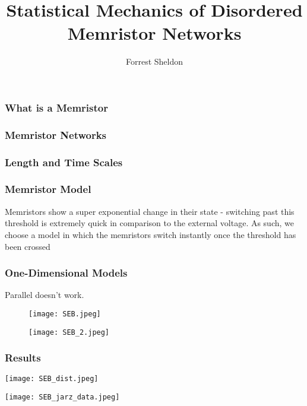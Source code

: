 \documentclass{beamer}
\title{Statistical Mechanics of Disordered Memristor Networks}
\author{Forrest Sheldon}
\begin{document}
\begin{frame}
\titlepage
\end{frame}

\begin{frame}
\frametitle{What is a Memristor}

\end{frame}


\begin{frame}
\frametitle{Memristor Networks}


\end{frame}

\begin{frame}
\frametitle{Length and Time Scales}


\end{frame}

\begin{frame}
\frametitle{Memristor Model}
Memristors show a super exponential change in their state - switching past
this threshold is extremely quick in comparison to the external voltage.  As such,
we choose a model in which the memristors switch instantly once the threshold has
been crossed
\end{frame}

\begin{frame}
\frametitle{One-Dimensional Models}
Parallel doesn't work.


\end{frame}

\begin{frame}

\begin{figure}
\centering
\begin{minipage}{.45\textwidth}
\centering
\texttt{[image: SEB.jpeg]}
\end{minipage}
\begin{minipage}{.45\textwidth}
\centering
\texttt{[image: SEB\_2.jpeg]}
\end{minipage}
\end{figure}

\end{frame}

\begin{frame}
\frametitle{Results}
\begin{center}
\texttt{[image: SEB\_dist.jpeg]}

\texttt{[image: SEB\_jarz\_data.jpeg]}

\end{center}
\end{frame}
\end{document}
